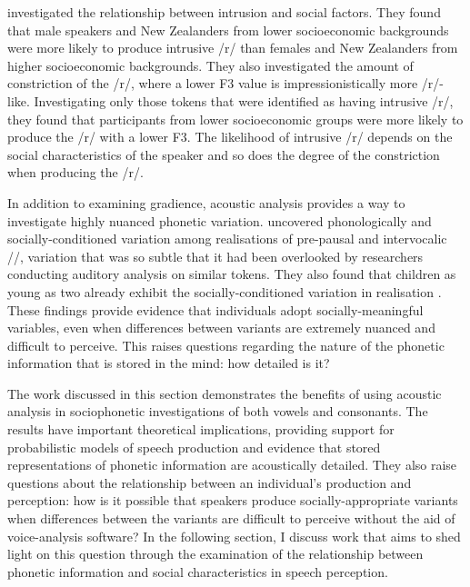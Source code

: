 \citet{haymaclagan2010} investigated the relationship between  intrusion and social factors. They found that male speakers and New Zealanders from lower socioeconomic backgrounds were more likely to produce intrusive /r/ than females and New Zealanders from higher socioeconomic backgrounds. They also investigated the amount of constriction of the /r/, where a lower F3 value is impressionistically more /r/-like. Investigating only those tokens that were identified as having intrusive /r/, they found that participants from lower socioeconomic groups were more likely to produce the /r/ with a lower F3. The likelihood of intrusive /r/ depends on the social characteristics of the speaker and so does the degree of the constriction when producing the /r/. 

In addition to examining gradience, acoustic analysis provides a way to investigate highly nuanced phonetic variation. \citet{dochertyfoulkes1999} uncovered phonologically and so\-cially-condi\-tioned variation among realisations of pre-pausal and intervocalic //, variation that was so subtle that it had been overlooked by researchers conducting auditory analysis on similar tokens. They also found that children as young as two already exhibit the socially-conditioned variation in  realisation \citep{foulkesdochertywatt2005}. These findings provide evidence that individuals adopt socially-meaningful variables, even when differences between variants are extremely nuanced and difficult to perceive. This raises questions regarding the nature of the phonetic information that is stored in the mind: how detailed is it?

The work discussed in this section demonstrates the benefits of using acoustic analysis in sociophonetic investigations of both vowels and consonants. The results have important theoretical implications, providing support for probabilistic models of speech production and evidence that stored representations of phonetic information are acoustically detailed. They also raise questions about the relationship between an individual's production and perception: how is it possible that speakers produce socially-appropriate variants when differences between the variants are difficult to perceive without the aid of voice-analysis software? In the following section, I discuss work that aims to shed light on this question through the examination of the relationship between phonetic information and social characteristics in speech perception.



